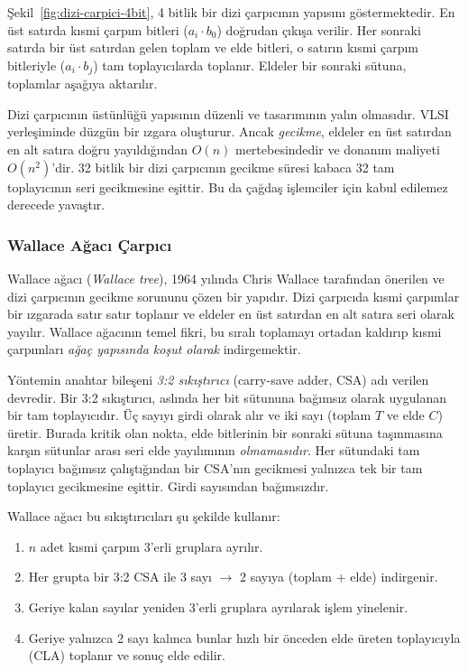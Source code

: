 Şekil~\ref{fig:dizi-carpici-4bit}, 4 bitlik bir dizi çarpıcının yapısını göstermektedir. En üst satırda kısmi çarpım bitleri ($a_i \cdot b_0$) doğrudan çıkışa verilir. Her sonraki satırda bir üst satırdan gelen toplam ve elde bitleri, o satırın kısmi çarpım bitleriyle ($a_i \cdot b_j$) tam toplayıcılarda toplanır. Eldeler bir sonraki sütuna, toplamlar aşağıya aktarılır.

Dizi çarpıcının üstünlüğü yapısının düzenli ve tasarımının yalın olmasıdır. VLSI yerleşiminde düzgün bir ızgara oluşturur. Ancak \emph{gecikme}, eldeler en üst satırdan en alt satıra doğru yayıldığından $O(n)$ mertebesindedir ve donanım maliyeti $O(n^2)$'dir. 32 bitlik bir dizi çarpıcının gecikme süresi kabaca 32 tam toplayıcının seri gecikmesine eşittir. Bu da çağdaş işlemciler için kabul edilemez derecede yavaştır.

\subsubsection{Wallace Ağacı Çarpıcı}
\label{sec:wallace-agaci}

Wallace ağacı (\emph{Wallace tree}), 1964 yılında Chris Wallace tarafından önerilen ve dizi çarpıcının gecikme sorununu çözen bir yapıdır. Dizi çarpıcıda kısmi çarpımlar bir ızgarada satır satır toplanır ve eldeler en üst satırdan en alt satıra seri olarak yayılır. Wallace ağacının temel fikri, bu sıralı toplamayı ortadan kaldırıp kısmi çarpımları \emph{ağaç yapısında koşut olarak} indirgemektir.

Yöntemin anahtar bileşeni \emph{3:2 sıkıştırıcı} (carry-save adder, CSA) adı verilen devredir. Bir 3:2 sıkıştırıcı, aslında her bit sütununa bağımsız olarak uygulanan bir tam toplayıcıdır. Üç sayıyı girdi olarak alır ve iki sayı (toplam $T$ ve elde $C$) üretir. Burada kritik olan nokta, elde bitlerinin bir sonraki sütuna taşınmasına karşın sütunlar arası seri elde yayılımının \emph{olmamasıdır}. Her sütundaki tam toplayıcı bağımsız çalıştığından bir CSA'nın gecikmesi yalnızca tek bir tam toplayıcı gecikmesine eşittir. Girdi sayısından bağımsızdır.

Wallace ağacı bu sıkıştırıcıları şu şekilde kullanır:
\begin{enumerate}[nosep]
    \item $n$ adet kısmi çarpım 3'erli gruplara ayrılır.
    \item Her grupta bir 3:2 CSA ile 3 sayı $\to$ 2 sayıya (toplam + elde) indirgenir.
    \item Geriye kalan sayılar yeniden 3'erli gruplara ayrılarak işlem yinelenir.
    \item Geriye yalnızca 2 sayı kalınca bunlar hızlı bir önceden elde üreten toplayıcıyla (CLA) toplanır ve sonuç elde edilir.
\end{enumerate}

